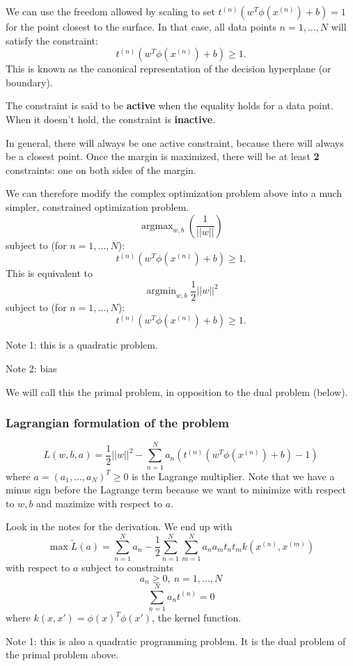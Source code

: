 \documentclass[a4paper,12pt]{article}
\DeclareMathOperator*{\argmin}{argmin}
\DeclareMathOperator*{\argmax}{argmax}
\begin{document}
We can use the freedom allowed by scaling to set $t^{(n)}(w^T\phi(x^{(n)}) + b) = 1$ for the point closest to the surface. In that case, all data points $n = 1, ..., N$ will satisfy the constraint: 
$$t^{(n)}(w^T\phi(x^{(n)}) + b) \geq 1.$$
This is known as the canonical representation of the decision hyperplane (or boundary). 

The constraint is said to be \textbf{active} when the equality holds for a data point. When it doesn't hold, the constraint is \textbf{inactive}. 

In general, there will always be one active constraint, because there will always be a closest point. Once the margin is maximized, there will be at least \textbf{2} constraints: one on both sides of the margin. 

We can therefore modify the complex optimization problem above into a much simpler, constrained optimization problem. 
$$\argmax_{w,b}\left(\frac{1}{||w||}\right)$$
subject to (for $n = 1, ..., N$): 
$$t^{(n)}(w^T\phi(x^{(n)}) + b) \geq 1.$$
This is equivalent to 
$$\argmin_{w,b}\frac{1}{2}||w||^2$$
subject to (for $n = 1, ..., N$): 
$$t^{(n)}(w^T\phi(x^{(n)}) + b) \geq 1.$$

Note 1: this is a quadratic problem. 

Note 2: bias

We will call this the primal problem, in opposition to the dual problem (below). 

\subsubsection{Lagrangian formulation of the problem}

$$L(w,b,a) = \frac{1}{2}||w||^2 - \sum^N_{n=1} a_n\left(t^{(n)}(w^T\phi(x^{(n)}) + b) - 1 \right)$$
where $a = (a_1, ..., a_N)^T \geq 0$ is the Lagrange multiplier. Note that we have a minus sign before the Lagrange term because we want to minimize with respect to $w, b$ and mazimize with respect to $a$. 

Look in the notes for the derivation. We end up with 
$$\max \tilde L(a) = \sum_{n=1}^N a_n - \frac{1}{2} \sum_{n=1}^N\sum_{m=1}^N a_n a_m t_n t_m k (x^{(n)}, x^{(m)})$$
with respect to $a$ subject to constraints
$$a_n \geq 0, ~ n=1,...,N$$
$$\sum_{n=1}^N a_nt^{(n)} = 0$$
where $k(x, x') = \phi(x)^T\phi(x')$, the kernel function. 

Note 1: this is also a quadratic programming problem. It is the dual problem of the primal problem above. 
\end{document}
